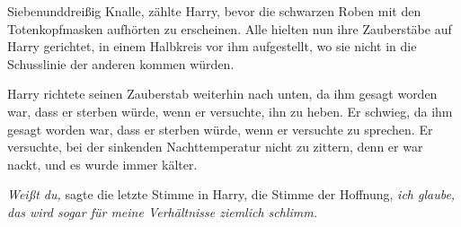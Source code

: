 Siebenunddreißig Knalle, zählte Harry, bevor die schwarzen Roben mit den Totenkopfmasken aufhörten zu erscheinen.
Alle hielten nun ihre Zauberstäbe auf Harry gerichtet, in einem Halbkreis vor ihm aufgestellt, wo sie nicht in die Schusslinie der anderen kommen würden.

Harry richtete seinen Zauberstab weiterhin nach unten, da ihm gesagt worden war, dass er sterben würde, wenn er versuchte, ihn zu heben. Er schwieg, da ihm gesagt worden war, dass er sterben würde, wenn er versuchte zu sprechen. Er versuchte, bei der sinkenden Nachttemperatur nicht zu zittern, denn er war nackt, und es wurde immer kälter.

\emph{Weißt du,} sagte die letzte Stimme in Harry, die Stimme der Hoffnung, \emph{ich glaube, das wird sogar für meine Verhältnisse ziemlich schlimm.}


